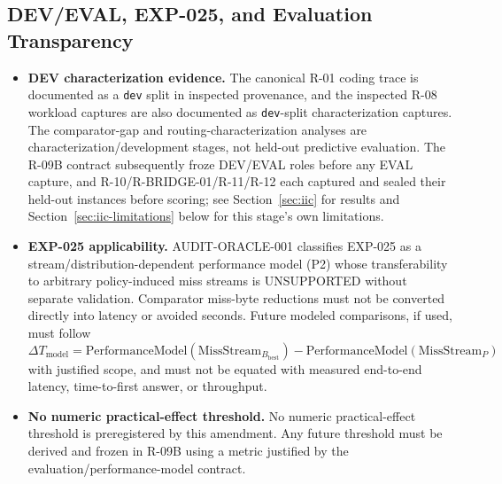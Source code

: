 \subsection*{DEV/EVAL, EXP-025, and Evaluation Transparency}
\begin{itemize}
 \item \textbf{DEV characterization evidence.} The canonical R-01 coding
   trace is documented as a \texttt{dev} split in inspected provenance, and
   the inspected R-08 workload captures are also documented as
   \texttt{dev}-split characterization captures. The comparator-gap and
   routing-characterization analyses are characterization/development
   stages, not held-out predictive evaluation. The R-09B contract
   subsequently froze DEV/EVAL
   roles before any EVAL capture, and R-10/R-BRIDGE-01/R-11/R-12 each
   captured and sealed their held-out instances before scoring; see
   Section~\ref{sec:iic} for results and Section~\ref{sec:iic-limitations}
   below for this stage's own limitations.
 \item \textbf{EXP-025 applicability.} \textsc{AUDIT-ORACLE-001} classifies
   EXP-025 as a stream/distribution-dependent performance model (P2) whose
   transferability to arbitrary policy-induced miss streams is
   \textsc{UNSUPPORTED} without separate validation. Comparator miss-byte
   reductions must not be converted directly into latency or avoided
   seconds. Future modeled comparisons, if used, must follow
   \begin{equation*}
   \Delta T_{\mathrm{model}} = \mathrm{PerformanceModel}(\mathrm{MissStream}_{B_\mathrm{best}})
   - \mathrm{PerformanceModel}(\mathrm{MissStream}_P)
   \end{equation*}
   with justified scope, and must not be equated with measured end-to-end
   latency, time-to-first answer, or throughput.
 \item \textbf{No numeric practical-effect threshold.} No numeric
   practical-effect threshold is preregistered by this amendment. Any
   future threshold must be derived and frozen in R-09B using a metric
   justified by the evaluation/performance-model contract.
\end{itemize}

